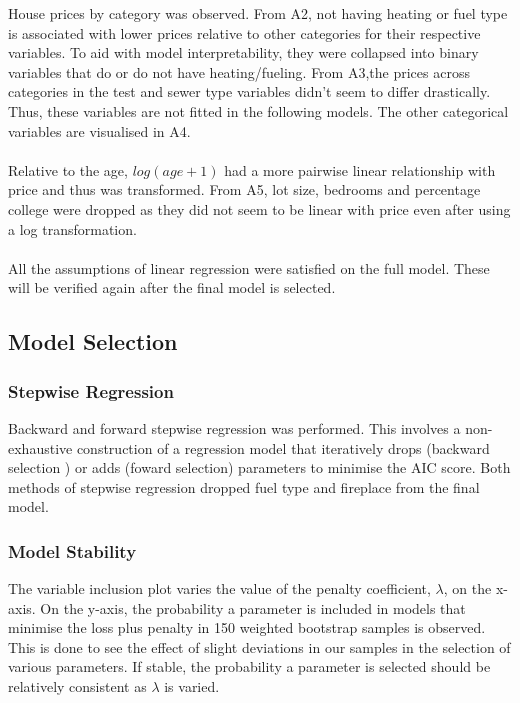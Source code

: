 \documentclass[letterpaper,9pt,twocolumn,twoside,]{pinp}
\begin{document}
\hfill\break
House prices by category was observed. From A2, not having heating or
fuel type is associated with lower prices relative to other categories
for their respective variables. To aid with model interpretability, they
were collapsed into binary variables that do or do not have
heating/fueling. From A3,the prices across categories in the test and
sewer type variables didn't seem to differ drastically. Thus, these
variables are not fitted in the following models. The other categorical
variables are visualised in A4.\\
~\\
\noindent Relative to the age, \(log(age+1)\) had a more pairwise linear
relationship with price and thus was transformed. From A5, lot size,
bedrooms and percentage college were dropped as they did not seem to be
linear with price even after using a log transformation.\\
~\\
\noindent All the assumptions of linear regression were satisfied on the
full model. These will be verified again after the final model is
selected.

\hypertarget{model-selection}{%
\subsection{Model Selection}\label{model-selection}}

\hypertarget{stepwise-regression}{%
\subsubsection{Stepwise Regression}\label{stepwise-regression}}

\hfill\break
Backward and forward stepwise regression was performed. This involves a
non-exhaustive construction of a regression model that iteratively drops
(backward selection ) or adds (foward selection) parameters to minimise
the AIC score. Both methods of stepwise regression dropped fuel type and
fireplace from the final model.

\hypertarget{model-stability}{%
\subsubsection{Model Stability}\label{model-stability}}

\hfill\break
The variable inclusion plot varies the value of the penalty coefficient,
\(\lambda\), on the x-axis. On the y-axis, the probability a parameter
is included in models that minimise the loss plus penalty in 150
weighted bootstrap samples is observed. This is done to see the effect
of slight deviations in our samples in the selection of various
parameters. If stable, the probability a parameter is selected should be
relatively consistent as \(\lambda\) is varied.
\end{document}

